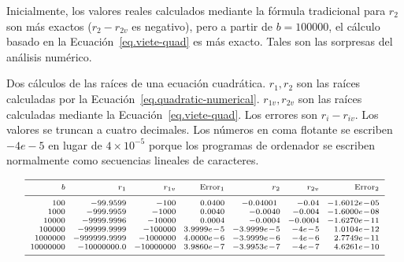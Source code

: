 Inicialmente, los valores reales calculados mediante la fórmula tradicional para $r_2$ son más exactos ($r_2-r_{2v}$ es negativo), pero a partir de $b=100000$, el cálculo basado en la Ecuación~\ref{eq.viete-quad} es más exacto. Tales son las sorpresas del análisis numérico.

\begin{table}[bht]
\caption[Dos cálculos de las raíces de una ecuación cuadrática]{Dos cálculos de las raíces de una ecuación cuadrática. $r_1,r_2$ son las raíces calculadas por la Ecuación~\ref{eq.quadratic-numerical}. $r_{1v},r_{2v}$ son las raíces calculadas mediante la Ecuación~\ref{eq.viete-quad}. Los errores son $r_{i}-r_{iv}$. Los valores se truncan a cuatro decimales.
Los números en coma flotante se escriben $-4e-5$ en lugar de $4\times 10^{-5}$ porque los programas de ordenador se escriben normalmente como secuencias lineales de caracteres.} \label{t.quadratic}
\[
\begin{scriptsize}
\begin{array}{r@{\hspace{2.5mm}}r@{\hspace{2.5mm}}r@{\hspace{2.5mm}}r@{\hspace{2.5mm}}r@{\hspace{2.5mm}}r@{\hspace{2.5mm}}r}
\hline
\noalign{\smallskip}
b & r_1 & r_{1v} & \mathrm{Error}_1 & r_2 & r_{2v} & \mathrm{Error}_2\\
\noalign{\smallskip}\hline\noalign{\smallskip}
100  &  -99.9599  &  -100  &  0.0400  &  -0.04001\  &  -0.04  &  -1.6012e\!-\!05\\
1000  &  -999.9959  &  -1000  &  0.0040  &  -0.0040  &  -0.004  &  -1.6000e\!-\!08\\
10000  &  -9999.9996  &  -10000  &  0.0004  &  -0.0004  &  -0.0004  &  -1.6270e\!-\!11\\
100000  &  -99999.9999  &  -100000  &  3.9999e\!-\!5  &  -3.9999e\!-\!5  &  -4e\!-\!5  &  1.0104e\!-\!12\\
1000000  &  -999999.9999  &  -1000000  &  4.0000e\!-\!6  &  -3.9999e\!-\!6  &  -4e\!-\!6  &  2.7749e\!-\!11\\
10000000  &  -10000000.0  &  -10000000  &  3.9860e\!-\!7  &  -3.9953e\!-\!7  &  -4e\!-\!7  &  4.6261e\!-\!10\\
 \noalign{\smallskip}
 \hline
\end{array}
\end{scriptsize}
\]
\end{table}

